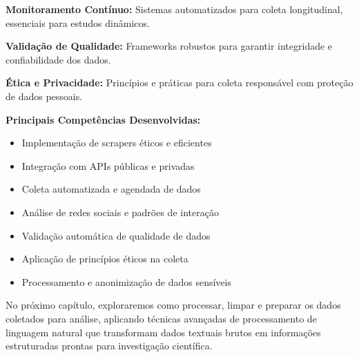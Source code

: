 \textbf{Monitoramento Contínuo:} Sistemas automatizados para coleta longitudinal, essenciais para estudos dinâmicos.

\textbf{Validação de Qualidade:} Frameworks robustos para garantir integridade e confiabilidade dos dados.

\textbf{Ética e Privacidade:} Princípios e práticas para coleta responsável com proteção de dados pessoais.

\begin{examplebox}
\textbf{Principais Competências Desenvolvidas:}
\begin{itemize}
    \item Implementação de scrapers éticos e eficientes
    \item Integração com APIs públicas e privadas
    \item Coleta automatizada e agendada de dados
    \item Análise de redes sociais e padrões de interação
    \item Validação automática de qualidade de dados
    \item Aplicação de princípios éticos na coleta
    \item Processamento e anonimização de dados sensíveis
\end{itemize}
\end{examplebox}

No próximo capítulo, exploraremos como processar, limpar e preparar os dados coletados para análise, aplicando técnicas avançadas de processamento de linguagem natural que transformam dados textuais brutos em informações estruturadas prontas para investigação científica.